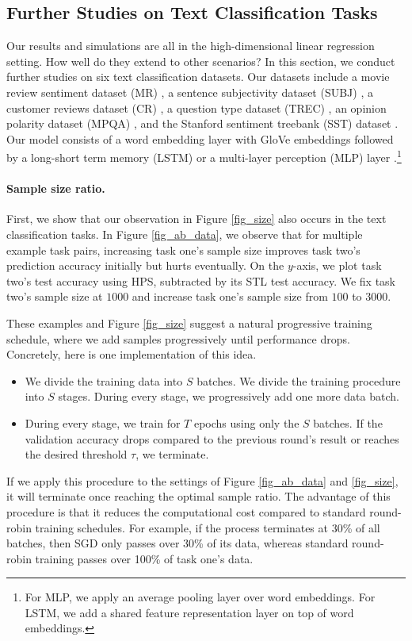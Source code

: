 \subsection{Further Studies on Text Classification Tasks}\label{sec_text}

Our results and simulations are all in the high-dimensional linear regression setting.
How well do they extend to other scenarios?
In this section, we conduct further studies on six text classification datasets.
Our datasets include a movie review sentiment dataset (MR) \cite{pang2005seeing}, a sentence subjectivity dataset (SUBJ) \cite{pang2004sentimental}, a customer reviews dataset (CR) \cite{hu2004mining}, a question type dataset (TREC) \cite{li2002learning}, an opinion polarity dataset (MPQA) \cite{wiebe2005annotating}, and the Stanford sentiment treebank (SST) dataset \cite{socher2013recursive}.
Our model consists of a word embedding layer with GloVe embeddings \cite{pennington2014glove} followed by a long-short term memory (LSTM) or a multi-layer perception (MLP) layer \cite{lei2018simple}.\footnote{For MLP, we apply an average pooling layer over word embeddings. For LSTM, we add a shared feature representation layer on top of word embeddings.}


\paragraph{Sample size ratio.}
First, we show that our observation in Figure \ref{fig_size} also occurs in the text classification tasks.
In Figure \ref{fig_ab_data}, we observe that for multiple example task pairs, increasing task one's sample size improves task two's prediction accuracy initially but hurts eventually.
On the $y$-axis, we plot task two's test accuracy using HPS, subtracted by its STL test accuracy.
We fix task two's sample size at $1000$ and increase task one's sample size from $100$ to $3000$.

These examples and Figure \ref{fig_size} suggest a natural progressive training schedule, where we add samples progressively until performance drops.
Concretely, here is one implementation of this idea.
\begin{itemize}
	\item We divide the training data into $S$ batches.
	We divide the training procedure into $S$ stages. During every stage, we progressively add one more data batch.
	\item During every stage, we train for $T$ epochs using only the $S$ batches. If the validation accuracy drops compared to the previous round's result or reaches the desired threshold $\tau$, we terminate.
\end{itemize}
If we apply this procedure to the settings of Figure \ref{fig_ab_data} and \ref{fig_size}, it will terminate once reaching the optimal sample ratio.
The advantage of this procedure is that it reduces the computational cost compared to standard round-robin training schedules.
For example, if the process terminates at 30\% of all batches, then SGD only passes over 30\% of its data, whereas standard round-robin training passes over 100\% of task one's data.


